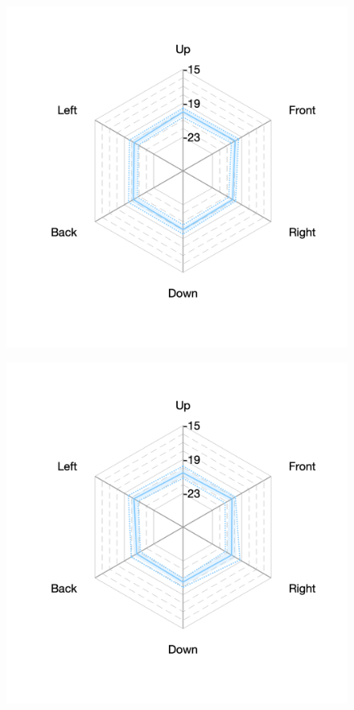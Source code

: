 \documentclass[11pt,a4j]{jreport}
\begin{document}
\begin{figure}[H]
      \begin{minipage}[b]{.33\textwidth}
        \centering
        \includegraphics[width=1\linewidth]{images/realHallDirSt/late_hall_d_allpoints.png}
        \label{fig:ホールDにおけるSTlate}
      \end{minipage}%
      \begin{minipage}[b]{.33\textwidth}
        \centering
        \includegraphics[width=1\linewidth]{images/realHallDirSt/late_hall_e_allpoints.png}

\end{minipage}
\end{figure}
\end{document}
